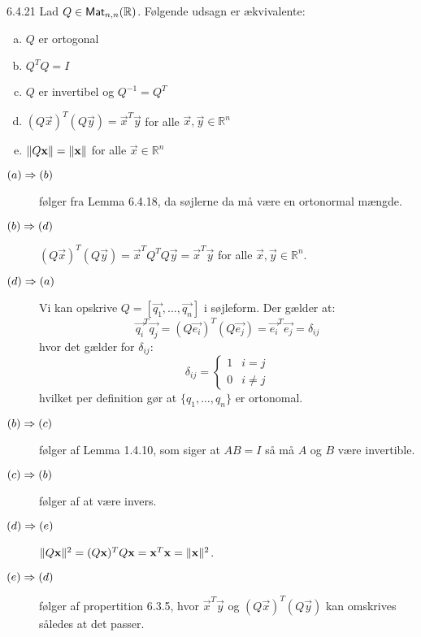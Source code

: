 \begin{saetning}{6.4.21}
	Lad $Q \in \textsf{Mat}_{n,n}(\mathbb{R})$. Følgende udsagn er ækvivalente:
	\begin{enumerate}[(a)]
		\item $Q$ er ortogonal
		\item $Q^TQ = I$
		\item $Q$ er invertibel og $Q^{-1} = Q^T$
		\item $(Q\vec{x})^T(Q\vec{y}) = \vec{x}^T\vec{y}$ for alle $\vec{x}, 
			\vec{y} \in \mathbb{R}^n$
		\item $\lVert Q\mathbf{x}\rVert = \lVert\mathbf{x}\rVert$ for alle $\vec{x} \in 
			\mathbb{R}^n$
	\end{enumerate}
\end{saetning}

\begin{bevis}
	\begin{description}
		\item[$(a)\Rightarrow(b)$] følger fra Lemma 6.4.18, da søjlerne da må være en 
			ortonormal mængde.
		\item[$(b)\Rightarrow(d)$] $(Q\vec{x})^T(Q\vec{y}) = \vec{x}^TQ^TQ\vec{y} = 
			\vec{x}^T\vec{y}$ for alle $\vec{x}, \vec{y} \in \mathbb{R}^n$.
		\item[$(d)\Rightarrow(a)$] Vi kan opskrive $Q = [\vec{q_1}, \dotsc, \vec{q_n}]$
			i søjleform. Der gælder at:
			\[
				\vec{q_i}^T\vec{q_j} = (Q\vec{e_i})^T(Q\vec{e_j}) = 
				\vec{e_i}^T\vec{e_j} = \delta_{ij}
			\]
			hvor det gælder for $\delta_{ij}$:
			\[
				\delta_{ij} = \begin{cases}1 & i = j\\0 & i \not= j\end{cases}
			\]
			hvilket per definition gør at $\{q_1, \dotsc, q_n\}$ er ortonomal.
		\item[$(b)\Rightarrow(c)$] følger af Lemma 1.4.10, som siger at $AB = I$ så må
			$A$ og $B$ være invertible.
		\item[$(c)\Rightarrow(b)$] følger af at være invers.
		\item[$(d)\Rightarrow(e)$] $\lVert Q\mathbf{x}\rVert^2 = (Q\mathbf{x})^TQ\mathbf{x} = 
			\mathbf{x}^T\mathbf{x} = \lVert\mathbf{x}\rVert^2$.
		\item[$(e)\Rightarrow(d)$] følger af propertition 6.3.5, hvor 
			$\vec{x}^T\vec{y}$ og $(Q\vec{x})^T(Q\vec{y})$ kan omskrives 
			således at det passer.
	\end{description}
\end{bevis}
